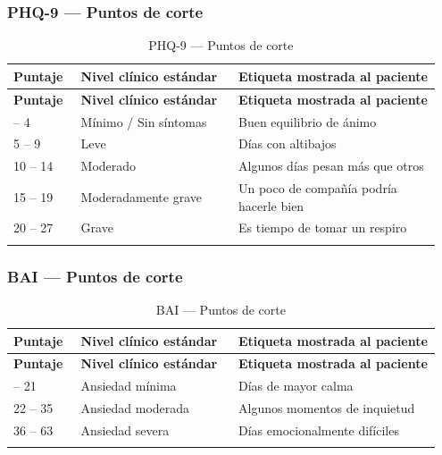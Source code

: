 \subsubsection{PHQ-9 --- Puntos de corte}

\begin{longtable}{p{0.15\linewidth} p{0.35\linewidth} p{0.45\linewidth}}
\toprule
\rowcolor{tableheader!20}
\textbf{Puntaje} & \textbf{Nivel clínico estándar} & \textbf{Etiqueta mostrada al paciente} \\
\midrule
\endfirsthead
\rowcolor{tableheader!20}
\textbf{Puntaje} & \textbf{Nivel clínico estándar} & \textbf{Etiqueta mostrada al paciente} \\
\midrule
\endhead
\bottomrule
\endfoot
0 -- 4   & Mínimo / Sin síntomas  & Buen equilibrio de ánimo \\
5 -- 9   & Leve                   & Días con altibajos \\
10 -- 14 & Moderado               & Algunos días pesan más que otros \\
15 -- 19 & Moderadamente grave    & Un poco de compañía podría hacerle bien \\
20 -- 27 & Grave                  & Es tiempo de tomar un respiro \\
\bottomrule
\caption{PHQ-9 --- Puntos de corte}
\label{tab:phq9_corte}
\end{longtable}

\subsubsection{BAI --- Puntos de corte}

\begin{longtable}{p{0.15\linewidth} p{0.35\linewidth} p{0.45\linewidth}}
\toprule
\rowcolor{tableheader!20}
\textbf{Puntaje} & \textbf{Nivel clínico estándar} & \textbf{Etiqueta mostrada al paciente} \\
\midrule
\endfirsthead
\rowcolor{tableheader!20}
\textbf{Puntaje} & \textbf{Nivel clínico estándar} & \textbf{Etiqueta mostrada al paciente} \\
\midrule
\endhead
\bottomrule
\endfoot
0 -- 21  & Ansiedad mínima   & Días de mayor calma \\
22 -- 35 & Ansiedad moderada & Algunos momentos de inquietud \\
36 -- 63 & Ansiedad severa   & Días emocionalmente difíciles \\
\bottomrule
\caption{BAI --- Puntos de corte}
\label{tab:bai_corte}
\end{longtable}

